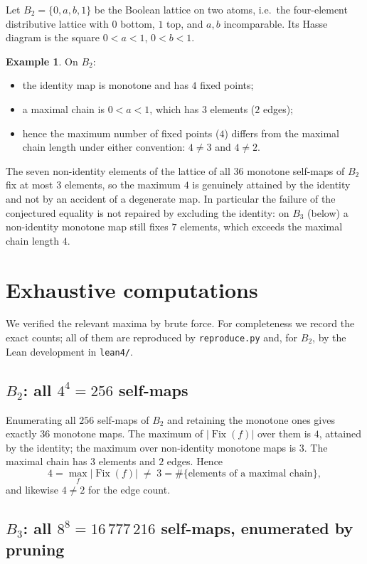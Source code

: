 \documentclass[11pt]{article}
\theoremstyle{definition}
\newtheorem{example}[theorem]{Example}
\newcommand{\Fix}{\operatorname{Fix}}
\begin{document}
Let $B_2 = \{0, a, b, 1\}$ be the Boolean lattice on two atoms, i.e.\ the
four-element distributive lattice with $0$ bottom, $1$ top, and $a, b$
incomparable. Its Hasse diagram is the square $0 < a < 1$, $0 < b < 1$.

\begin{example}
\label{ex:b2}
On $B_2$:
\begin{itemize}
\item the identity map is monotone and has $4$ fixed points;
\item a maximal chain is $0 < a < 1$, which has $3$ elements ($2$ edges);
\item hence the maximum number of fixed points ($4$) differs from the maximal
chain length under either convention: $4 \neq 3$ and $4 \neq 2$.
\end{itemize}
\end{example}

The seven non-identity elements of the lattice of all $36$ monotone self-maps
of $B_2$ fix at most $3$ elements, so the maximum $4$ is genuinely attained by
the identity and not by an accident of a degenerate map. In particular the
failure of the conjectured equality is not repaired by excluding the identity:
on $B_3$ (below) a non-identity monotone map still fixes $7$ elements, which
exceeds the maximal chain length $4$.

\section{Exhaustive computations}

We verified the relevant maxima by brute force. For completeness we record the
exact counts; all of them are reproduced by \texttt{reproduce.py} and, for
$B_2$, by the Lean development in \texttt{lean4/}.

\subsection{$B_2$: all $4^4 = 256$ self-maps}

Enumerating all $256$ self-maps of $B_2$ and retaining the monotone ones gives
exactly $36$ monotone maps. The maximum of $|\Fix(f)|$ over them is $4$,
attained by the identity; the maximum over non-identity monotone maps is $3$.
The maximal chain has $3$ elements and $2$ edges. Hence
\[
  4 = \max_f |\Fix(f)| \;\neq\; 3 = \#\{\text{elements of a maximal chain}\},
\]
and likewise $4 \neq 2$ for the edge count.

\subsection{$B_3$: all $8^8 = 16\,777\,216$ self-maps, enumerated by pruning}
\end{document}
